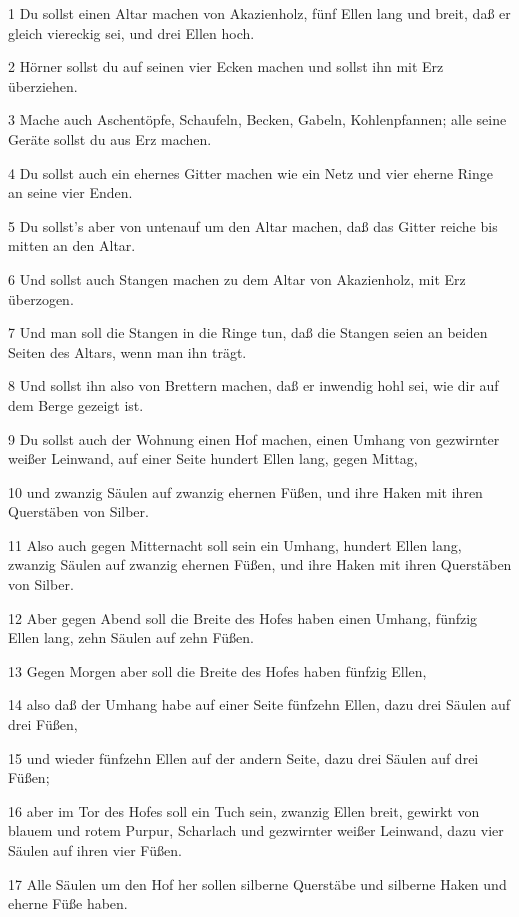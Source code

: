 \par 1 Du sollst einen Altar machen von Akazienholz, fünf Ellen lang und breit, daß er gleich viereckig sei, und drei Ellen hoch.
\par 2 Hörner sollst du auf seinen vier Ecken machen und sollst ihn mit Erz überziehen.
\par 3 Mache auch Aschentöpfe, Schaufeln, Becken, Gabeln, Kohlenpfannen; alle seine Geräte sollst du aus Erz machen.
\par 4 Du sollst auch ein ehernes Gitter machen wie ein Netz und vier eherne Ringe an seine vier Enden.
\par 5 Du sollst's aber von untenauf um den Altar machen, daß das Gitter reiche bis mitten an den Altar.
\par 6 Und sollst auch Stangen machen zu dem Altar von Akazienholz, mit Erz überzogen.
\par 7 Und man soll die Stangen in die Ringe tun, daß die Stangen seien an beiden Seiten des Altars, wenn man ihn trägt.
\par 8 Und sollst ihn also von Brettern machen, daß er inwendig hohl sei, wie dir auf dem Berge gezeigt ist.
\par 9 Du sollst auch der Wohnung einen Hof machen, einen Umhang von gezwirnter weißer Leinwand, auf einer Seite hundert Ellen lang, gegen Mittag,
\par 10 und zwanzig Säulen auf zwanzig ehernen Füßen, und ihre Haken mit ihren Querstäben von Silber.
\par 11 Also auch gegen Mitternacht soll sein ein Umhang, hundert Ellen lang, zwanzig Säulen auf zwanzig ehernen Füßen, und ihre Haken mit ihren Querstäben von Silber.
\par 12 Aber gegen Abend soll die Breite des Hofes haben einen Umhang, fünfzig Ellen lang, zehn Säulen auf zehn Füßen.
\par 13 Gegen Morgen aber soll die Breite des Hofes haben fünfzig Ellen,
\par 14 also daß der Umhang habe auf einer Seite fünfzehn Ellen, dazu drei Säulen auf drei Füßen,
\par 15 und wieder fünfzehn Ellen auf der andern Seite, dazu drei Säulen auf drei Füßen;
\par 16 aber im Tor des Hofes soll ein Tuch sein, zwanzig Ellen breit, gewirkt von blauem und rotem Purpur, Scharlach und gezwirnter weißer Leinwand, dazu vier Säulen auf ihren vier Füßen.
\par 17 Alle Säulen um den Hof her sollen silberne Querstäbe und silberne Haken und eherne Füße haben.
